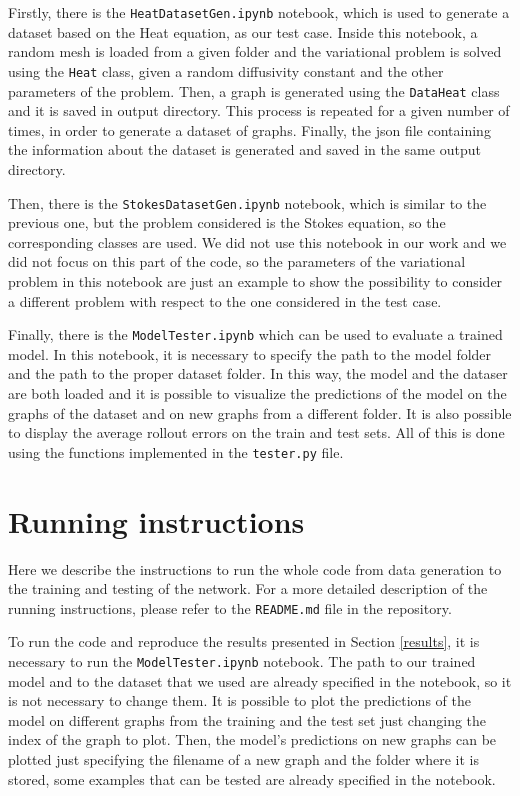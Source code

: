 \documentclass[11pt,a4paper]{article}
\begin{document}
Firstly, there is the \texttt{HeatDatasetGen.ipynb} notebook, which is used to generate a dataset based on the Heat equation, as our test case. Inside this notebook, a random mesh is loaded from a given folder and the variational problem is solved using the \texttt{Heat} class, given a random diffusivity constant and the other parameters of the problem. Then, a graph is generated using the \texttt{DataHeat} class and it is saved in output directory. This process is repeated for a given number of times, in order to generate a dataset of graphs. Finally, the json file containing the information about the dataset is generated and saved in the same output directory. 

Then, there is the \texttt{StokesDatasetGen.ipynb} notebook, which is similar to the previous one, but the problem considered is the Stokes equation, so the corresponding classes are used. We did not use this notebook in our work and we did not focus on this part of the code, so the parameters of the variational problem in this notebook are just an example to show the possibility to consider a different problem with respect to the one considered in the test case.

Finally, there is the \texttt{ModelTester.ipynb} which can be used to evaluate a trained model. In this notebook, it is necessary to specify the path to the model folder and the path to the proper dataset folder. In this way, the model and the dataser are both loaded and it is possible to visualize the predictions of the model on the graphs of the dataset and on new graphs from a different folder. It is also possible to display the average rollout errors on the train and test sets. All of this is done using the functions implemented in the \texttt{tester.py} file.

\section{Running instructions}

Here we describe the instructions to run the whole code from data generation to the training and testing of the network. For a more detailed description of the running instructions, please refer to the \texttt{README.md} file in the repository.

To run the code and reproduce the results presented in Section \ref{results}, it is necessary to run the \texttt{ModelTester.ipynb} notebook. The path to our trained model and to the dataset that we used are already specified in the notebook, so it is not necessary to change them. It is possible to plot the predictions of the model on different graphs from the training and the test set just changing the index of the graph to plot. Then, the model's predictions on new graphs can be plotted just specifying the filename of a new graph and the folder where it is stored, some examples that can be tested are already specified in the notebook. 
\end{document}
